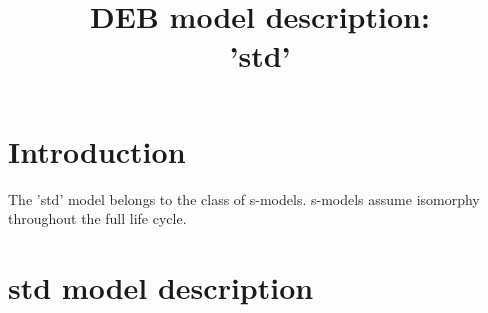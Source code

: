 \documentclass{article}
\title{DEB model description:\\ 
'std'}
\date
\begin{document}
\maketitle

\section{Introduction}


The 'std' model belongs to the class of s-models.
s-models assume isomorphy throughout the full life cycle.

\section{std model description}




\end{document}
